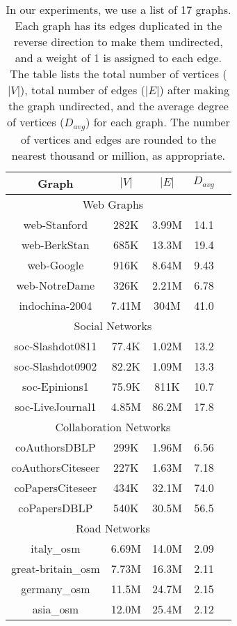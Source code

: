 \begin{table}[!ht]
\centering
\caption{In our experiments, we use a list of 17 graphs. Each graph has its edges duplicated in the reverse direction to make them undirected, and a weight of 1 is assigned to each edge. The table lists the total number of vertices ($|V|$), total number of edges ($|E|$) after making the graph undirected, and the average degree of vertices ($D_{avg}$) for each graph. The number of vertices and edges are rounded to the nearest thousand or million, as appropriate.}
\label{tab:dataset}
\begin{tabular}{||c||c|c|c|c||}
  \toprule
  \textbf{Graph} &
  \textbf{$|V|$} &
  \textbf{$|E|$} &
  \textbf{$D_{avg}$} \\
  \midrule
  \multicolumn{4}{|c|}{Web Graphs} \\ \hline
    web-Stanford & 282K & 3.99M & 14.1 \\ \hline
    web-BerkStan & 685K & 13.3M & 19.4 \\ \hline
    web-Google & 916K & 8.64M & 9.43 \\ \hline
    web-NotreDame & 326K & 2.21M & 6.78 \\ \hline
    indochina-2004 & 7.41M & 304M & 41.0 \\ \hline
    \multicolumn{4}{|c|}{Social Networks} \\ \hline
    soc-Slashdot0811 & 77.4K & 1.02M & 13.2 \\ \hline
    soc-Slashdot0902 & 82.2K & 1.09M & 13.3 \\ \hline
    soc-Epinions1 & 75.9K & 811K & 10.7 \\ \hline
    soc-LiveJournal1 & 4.85M & 86.2M & 17.8 \\ \hline
    \multicolumn{4}{|c|}{Collaboration Networks} \\ \hline
    coAuthorsDBLP & 299K & 1.96M & 6.56 \\ \hline
    coAuthorsCiteseer & 227K & 1.63M & 7.18 \\ \hline
    coPapersCiteseer & 434K & 32.1M & 74.0 \\ \hline
    coPapersDBLP & 540K & 30.5M & 56.5 \\ \hline
    \multicolumn{4}{|c|}{Road Networks} \\ \hline
    italy\_osm & 6.69M & 14.0M & 2.09 \\ \hline
    great-britain\_osm & 7.73M & 16.3M & 2.11 \\ \hline
    germany\_osm & 11.5M & 24.7M & 2.15 \\ \hline
    asia\_osm & 12.0M & 25.4M & 2.12 \\ \hline
  \bottomrule
\end{tabular}
\end{table}
